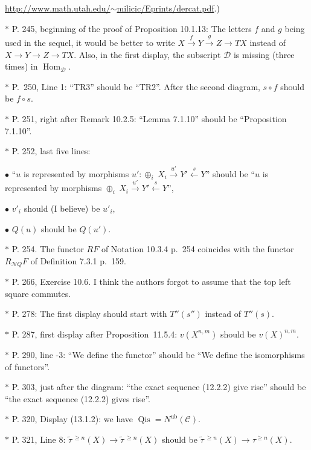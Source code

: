 \documentclass[12pt]{article}%
\theoremstyle{remark}
\theoremstyle{definition}
\newcommand{\bu}{\bullet}
\newcommand{\nn}{\noindent}
\newcommand{\cc}{\mathcal}
\newcommand{\oo}{\operatorname}
\newcommand{\C}{\mathcal C}
\newcommand{\xr}{\xrightarrow}
\DeclareMathOperator{\Hom}{Hom}%
\begin{document}
\href{http://www.math.utah.edu/~milicic/Eprints/dercat.pdf}{http://www.math.utah.edu/$\sim$milicic/Eprints/dercat.pdf}.)

\noindent $*$ P. 245, beginning of the proof of Proposition 10.1.13: The letters $f$ and $g$ being used in the sequel, it would be better to write $X\xr fY\xr gZ\to TX$ instead of $X\to Y\to Z\to TX$. Also, in the first display, the subscript $\cc D$ is missing (three times) in $\Hom_{\cc D}$.

\noindent $*$ P.~250, Line 1: ``TR3'' should be ``TR2''. After the second diagram, $s\circ f$ should be $f\circ s$.

\noindent $*$ P. 251, right after Remark 10.2.5: ``Lemma 7.1.10'' should be ``Proposition 7.1.10''.

\noindent $*$ P. 252, last five lines:

$\bu$ ``$u$ is represented by morphisms $u':\oplus_i\ X_i\xr{u'}Y'\xleftarrow sY$'' should be ``$u$ is represented by morphisms $\oplus_i\ X_i\xr{u'}Y'\xleftarrow sY$'',

$\bu$ $v'_i$ should (I believe) be $u'_i$,


$\bu$ $Q(u)$ should be $Q(u')$.

\noindent $*$ P. 254. The functor $RF$ of Notation 10.3.4 p.~254 coincides with the functor $R_{\cc NQ}F$ of Definition 7.3.1 p.~159.

\noindent $*$ P. 266, Exercise 10.6. I think the authors forgot to assume that the top left square commutes.


\nn $*$ P. 278: The first display should start with $T''(s'')$ instead of $T''(s)$.

\nn $*$ P. 287, first display after Proposition~11.5.4: $v(X^{n,m})$ should be $v(X)^{n,m}$.

\nn $*$ P. 290, line -3: ``We define the functor'' should be ``We define the isomorphisms of functors''.

\noindent $*$ P. 303, just after the diagram: ``the exact sequence (12.2.2) give rise'' should be ``the exact sequence (12.2.2) gives rise''.

\nn $*$ P. 320, Display (13.1.2): we have $\oo{Qis}=N^{\oo{ub}}(\C)$.

\noindent $*$ P. 321, Line 8: $\widetilde\tau\,{}^{\ge n}(X)\to\widetilde\tau\,{}^{\ge n}(X)$ should be $\widetilde\tau\,{}^{\ge n}(X)\to\tau^{\ge n}(X)$.
\end{document}
